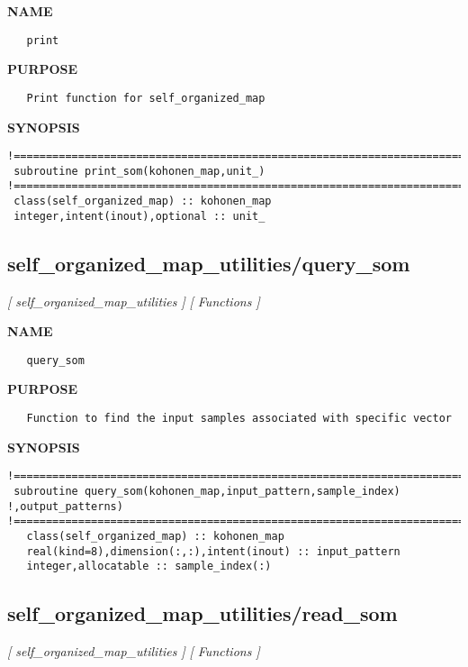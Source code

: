 \documentclass{article}
\begin{document}
\label{ch:robo51}
\label{ch:self_organized_map_utilities_print}
\textbf{NAME}
\begin{verbatim}
   print
\end{verbatim}
\textbf{PURPOSE}
\begin{verbatim}
   Print function for self_organized_map 
\end{verbatim}
\textbf{SYNOPSIS}
\begin{verbatim}
!========================================================================================
 subroutine print_som(kohonen_map,unit_)
!========================================================================================
 class(self_organized_map) :: kohonen_map
 integer,intent(inout),optional :: unit_
\end{verbatim}
\newpage
\subsection{self\_organized\_map\_utilities/query\_som}
\textsl{[ self\_organized\_map\_utilities ]}
\textsl{[ Functions ]}

\label{ch:robo52}
\label{ch:self_organized_map_utilities_query_som}
\textbf{NAME}
\begin{verbatim}
   query_som
\end{verbatim}
\textbf{PURPOSE}
\begin{verbatim}
   Function to find the input samples associated with specific vector 
\end{verbatim}
\textbf{SYNOPSIS}
\begin{verbatim}
!========================================================================================
 subroutine query_som(kohonen_map,input_pattern,sample_index) !,output_patterns)
!========================================================================================
   class(self_organized_map) :: kohonen_map
   real(kind=8),dimension(:,:),intent(inout) :: input_pattern
   integer,allocatable :: sample_index(:)
\end{verbatim}
\newpage
\subsection{self\_organized\_map\_utilities/read\_som}
\textsl{[ self\_organized\_map\_utilities ]}
\textsl{[ Functions ]}
\end{document}
